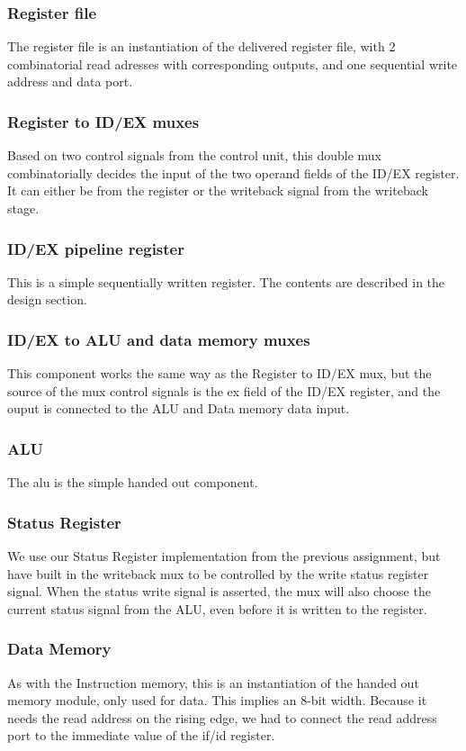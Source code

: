 \documentclass[11pt]{report}
\begin{document}
\subsubsection*{Register file}
The register file is an instantiation of the delivered register file, with 
2 combinatorial read adresses with corresponding outputs, and one sequential
write address and data port.

\subsubsection*{Register to ID/EX muxes}
Based on two control signals from the control unit, this double mux combinatorially
decides the input of the two operand fields of the ID/EX register. It can 
either be from the register or the writeback signal from the writeback stage.
\subsubsection*{ID/EX pipeline register}
This is a simple sequentially written register. The contents are described in the 
design section. %
\subsubsection*{ID/EX to ALU and data memory muxes}
This component works the same way as the Register to ID/EX mux, but the source of the 
mux control signals is the ex field of the ID/EX register, and the ouput is connected
to the ALU and Data memory data input.

\subsubsection*{ALU}
The alu is the simple handed out component.
\subsubsection*{Status Register}
We use our Status Register implementation from the previous assignment, but have
built in the writeback mux to be controlled by the write status register signal.
When the status write signal is asserted, the mux will also choose the current 
status signal from the ALU, even before it is written to the register.
\subsubsection*{Data Memory}
As with the Instruction memory, this is an instantiation of the handed out memory
module, only used for data. This implies an 8-bit width. Because it needs the read address
on the rising edge, we had to connect the read address port to the immediate value of the
if/id register.
\end{document}
